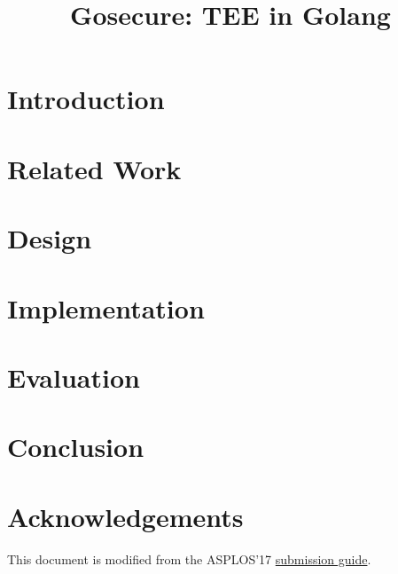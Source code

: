 \documentclass[pageno]{jpaper}
\begin{document}
\title{Gosecure: TEE in Golang}

\date{}
\maketitle

\thispagestyle{empty}

\begin{abstract}



\end{abstract}

\section{Introduction}


\section{Related Work}



\section{Design}



\section{Implementation}



\section{Evaluation}



\section{Conclusion}



\section{Acknowledgements}

This document is modified from the ASPLOS'17 \href{http://novel.ict.ac.cn/ASPLOS2017/files/asplos17-template.pdf}{submission guide}.



\end{document}
